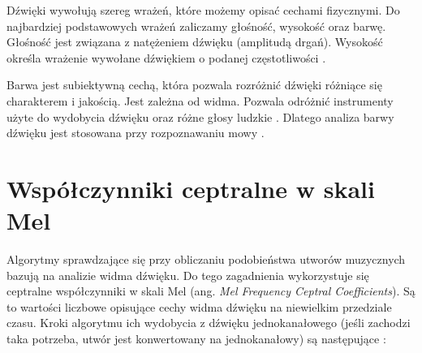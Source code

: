 Dźwięki wywołują szereg wrażeń, które możemy opisać cechami
fizycznymi. Do najbardziej podstawowych wrażeń zaliczamy głośność, wysokość oraz
barwę. Głośność jest związana z natężeniem dźwięku (amplitudą drgań). Wysokość
określa wrażenie wywołane dźwiękiem o podanej częstotliwości 
\cite{zarysoMuzyce}.

Barwa jest subiektywną cechą, która pozwala rozróżnić dźwięki różniące się
charakterem i jakością. Jest zależna od widma. Pozwala odróżnić instrumenty
użyte do wydobycia dźwięku oraz różne głosy ludzkie \cite{zarysoMuzyce}. Dlatego
analiza barwy dźwięku jest stosowana przy
rozpoznawaniu mowy \cite{rozdzialQBH_MFCC}.

\section{Współczynniki ceptralne w skali Mel}
Algorytmy sprawdzające się przy obliczaniu podobieństwa utworów muzycznych
bazują na analizie widma dźwięku. Do tego zagadnienia wykorzystuje się ceptralne
współczynniki w skali Mel (ang. \textit{Mel Frequency Ceptral Coefficients}). Są
to wartości
liczbowe opisujące cechy widma dźwięku na niewielkim przedziale czasu. Kroki
algorytmu ich wydobycia z dźwięku jednokanałowego (jeśli zachodzi taka
potrzeba, utwór jest konwertowany na jednokanałowy) 
są następujące \cite{magisterska}:

